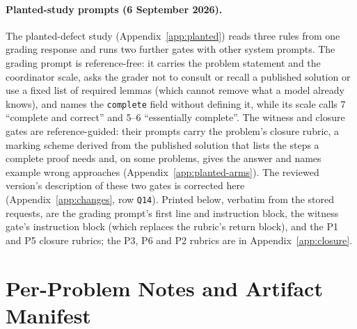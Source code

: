 \paragraph{Planted-study prompts (6 September 2026).} The planted-defect study (Appendix~\ref{app:planted}) reads three rules from one grading response and runs two further gates with other system prompts. The grading prompt is reference-free: it carries the problem statement and the coordinator scale, asks the grader not to consult or recall a published solution or use a fixed list of required lemmas (which cannot remove what a model already knows), and names the \texttt{complete} field without defining it, while its scale calls 7 ``complete and correct'' and 5--6 ``essentially complete''. The witness and closure gates are reference-guided: their prompts carry the problem's closure rubric, a marking scheme derived from the published solution that lists the steps a complete proof needs and, on some problems, gives the answer and names example wrong approaches (Appendix~\ref{app:planted-arms}). The reviewed version's description of these two gates is corrected here (Appendix~\ref{app:changes}, row \texttt{Q14}). Printed below, verbatim from the stored requests, are the grading prompt's first line and instruction block, the witness gate's instruction block (which replaces the rubric's return block), and the P1 and P5 closure rubrics; the P3, P6 and P2 rubrics are in Appendix~\ref{app:closure}.


\section{Per-Problem Notes and Artifact Manifest}
\label{app:manifest}


